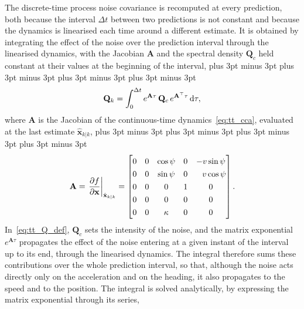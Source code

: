 The discrete-time process noise covariance is recomputed at every prediction, both because the
interval $\Delta t$ between two predictions is not constant and because the dynamics is
linearised each time around a different estimate. It is obtained by integrating the effect
of the noise over the prediction interval through the linearised dynamics, with the Jacobian
$\mathbf{A}$ and the spectral density $\mathbf{Q}_c$ held constant at their values at the
beginning of the interval,
\abovedisplayskip=16pt plus 3pt minus 3pt \belowdisplayskip=16pt plus 3pt minus 3pt
\abovedisplayshortskip=16pt plus 3pt minus 3pt \belowdisplayshortskip=16pt plus 3pt minus 3pt
\begin{equation}
    \renewcommand{\arraystretch}{1.3}\setlength{\jot}{8pt}
    \mathbf{Q}_k = \int_0^{\Delta t} e^{\mathbf{A}\tau}\,\mathbf{Q}_c\,
        e^{\mathbf{A}^\top\tau}\,\mathrm{d}\tau,
    \label{eq:tt_Q_def}
\end{equation}
where $\mathbf{A}$ is the Jacobian of the continuous-time dynamics~\eqref{eq:tt_cca},
evaluated at the last estimate $\hat{\mathbf{x}}_{k|k}$,
\abovedisplayskip=16pt plus 3pt minus 3pt \belowdisplayskip=16pt plus 3pt minus 3pt
\abovedisplayshortskip=16pt plus 3pt minus 3pt \belowdisplayshortskip=16pt plus 3pt minus 3pt
\begin{equation}
    \renewcommand{\arraystretch}{1.3}\setlength{\jot}{8pt}
    \mathbf{A} = \left.\frac{\partial f}{\partial \mathbf{x}}\right|_{\hat{\mathbf{x}}_{k|k}} =
    \begin{bmatrix}
        0 & 0 & \cos\psi & 0 & -v\sin\psi \\
        0 & 0 & \sin\psi & 0 & \phantom{-}v\cos\psi \\
        0 & 0 & 0 & 1 & 0 \\
        0 & 0 & 0 & 0 & 0 \\
        0 & 0 & \kappa & 0 & 0
    \end{bmatrix}.
    \label{eq:tt_A}
\end{equation}
In~\eqref{eq:tt_Q_def}, $\mathbf{Q}_c$ sets the intensity of the noise, and the matrix
exponential $e^{\mathbf{A}\tau}$ propagates the effect of the noise entering at a given instant
of the interval up to its end, through the linearised dynamics. The integral therefore sums
these contributions over the whole prediction interval, so that, although the noise acts
directly only on the acceleration and on the heading, it also propagates to the speed and to
the position. The integral is solved analytically, by expressing the matrix exponential through its series,
